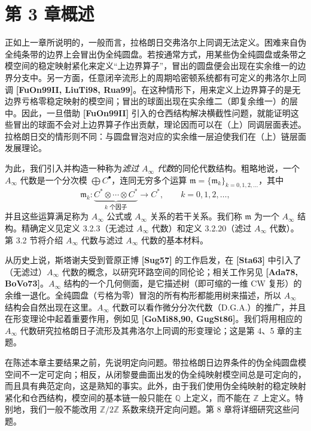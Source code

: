 
\section{第 3 章概述}
\label{sec:3-1}

正如上一章所说明的，一般而言，拉格朗日交弗洛尔上同调无法定义。困难来自伪全纯条带的边界上会冒出伪全纯圆盘。若按通常方式，用某些伪全纯圆盘或条带之模空间的稳定映射紧化来定义“上边界算子”，冒出的圆盘便会出现在实余维一的边界分支中。另一方面，任意闭辛流形上的周期哈密顿系统都有可定义的弗洛尔上同调
\textbf{[FuOn99II, LiuTi98, Rua99]}。在这种情形下，用来定义上边界算子的是无边界亏格零稳定映射的模空间；冒出的球面出现在实余维二（即复余维一）的层中。因此，一旦借助 \textbf{[FuOn99II]} 引入的仓西结构解决横截性问题，就能证明这些冒出的球面不会对上边界算子作出贡献，理论因而可以在（上）同调层面表述。拉格朗日交的情形则不同：与圆盘冒泡对应的实余维一层迫使我们在（上）链层面发展理论。

为此，我们引入并构造一种称为\emph{滤过 $A_\infty$ 代数}的同伦代数结构。粗略地说，一个 $A_\infty$ 代数是一个分次模 $\bigoplus C^\bullet$，连同无穷多个运算
$\mathfrak m=\{\mathfrak m_k\}_{k=0,1,2,\ldots}$，其中
\[
  \mathfrak m_k\colon
  \underbrace{C^*\otimes\cdots\otimes C^*}_{k\text{ 个因子}}
  \longrightarrow C^*,
  \qquad k=0,1,2,\ldots,
\]
并且这些运算满足称为 $A_\infty$ 公式或 $A_\infty$ 关系的若干关系。我们称
$\mathfrak m$ 为一个 $A_\infty$ 结构。精确定义见定义 3.2.3（无滤过
$A_\infty$ 代数）和定义 3.2.20（滤过 $A_\infty$ 代数）。第 3.2 节将介绍
$A_\infty$ 代数与滤过 $A_\infty$ 代数的基本材料。

从历史上说，斯塔谢夫受到菅原正博 \textbf{[Sug57]} 的工作启发，在
\textbf{[Sta63]} 中引入了（无滤过）$A_\infty$ 代数的概念，以研究环路空间的同伦论；相关工作另见 \textbf{[Ada78, BoVo73]}。$A_\infty$ 结构的一个几何侧面，是它描述树（即可缩的一维 CW 复形）的余维一退化。全纯圆盘（亏格为零）冒泡的所有构形都能用树来描述，所以 $A_\infty$ 结构会自然出现在这里。$A_\infty$ 代数可以看作微分分次代数（D.G.A.）的推广，并且在形变理论中起着重要作用，例如见 \textbf{[GoMi88,90, GugSt86]}。我们将用相应的 $A_\infty$ 代数研究拉格朗日子流形及其弗洛尔上同调的形变理论；这是第 4、5 章的主题。

在陈述本章主要结果之前，先说明定向问题。带拉格朗日边界条件的伪全纯圆盘模空间不一定可定向；相反，从闭黎曼曲面出发的伪全纯映射模空间总是可定向的，而且具有典范定向，这是熟知的事实。此外，由于我们使用伪全纯映射的稳定映射紧化和仓西结构，模空间的基本链一般只能在 $\mathbb Q$ 上定义，而不能在 $\mathbb Z$ 上定义。特别地，我们一般不能改用 $\mathbb Z/2\mathbb Z$ 系数来绕开定向问题。第 8 章将详细研究这些问题。

